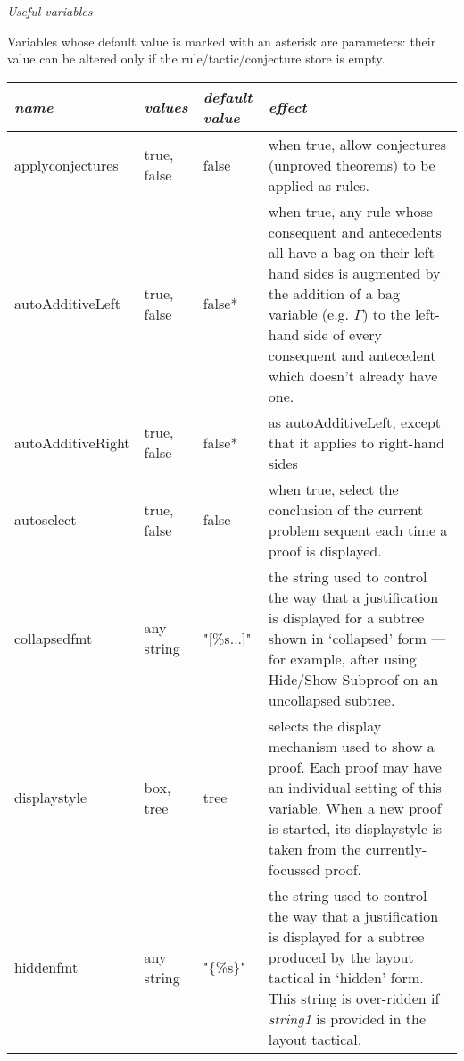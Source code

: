 \textit{Useful variables}


Variables whose default value is marked with an asterisk are parameters: their value can be altered only if the rule/tactic/conjecture store is empty.\\


\begin{tabular}{|p{1.034in}|p{0.635in}|p{0.717in}|p{2.114in}|} \hline
{\raggedright \textit{name}} & {\raggedright \textit{values}} & {\raggedright \textit{default value}} & {\raggedright \textit{effect}}\\
\hline
{\raggedright applyconjectures} & {\raggedright true, false} & {\raggedright false} & {\raggedright when true, allow conjectures (unproved theorems) to be applied as rules.}\\
\hline
{\raggedright autoAdditiveLeft} & {\raggedright true, false} & {\raggedright false*} & {\raggedright when true, any rule whose consequent and antecedents all have a bag on their left-hand sides is augmented by the addition of a bag variable (e.g. \ensuremath{\Gamma}) to the left-hand side of every consequent and antecedent which doesn't already have one.}\\
\hline
{\raggedright autoAdditiveRight} & {\raggedright true, false} & {\raggedright false*} & {\raggedright as autoAdditiveLeft, except that it applies to right-hand sides}\\
\hline
{\raggedright autoselect} & {\raggedright true, false} & {\raggedright false} & {\raggedright when true, select the conclusion of the current problem sequent each time a proof is displayed.}\\
\hline
{\raggedright collapsedfmt} & {\raggedright any string} & {\raggedright "[\%s...]"} & {\raggedright the string used to control the way that a justification is displayed for a subtree shown in `collapsed' form --- for example, after using Hide/Show Subproof on an uncollapsed subtree.}\\
\hline
{\raggedright displaystyle} & {\raggedright box, tree} & {\raggedright tree} & {\raggedright selects the display mechanism used to show a proof. Each proof may have an individual setting of this variable. When a new proof is started, its displaystyle is taken from the currently-focussed proof.}\\
\hline
{\raggedright hiddenfmt} & {\raggedright any string} & {\raggedright "\{\%s\}"} & {\raggedright the string used to control the way that a justification is displayed for a subtree produced by the layout tactical in `hidden' form. This string is over-ridden if \textit{string1} is provided in the layout tactical.}\\

\end{tabular}
